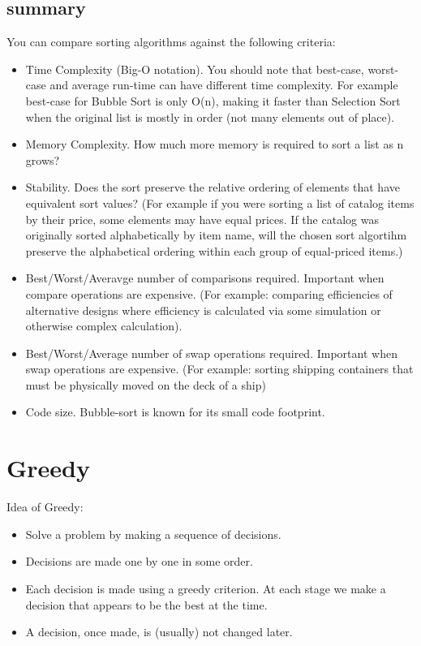 \documentclass[a4paper,11pt,twoside]{book}
\begin{document}
\subsection{summary}
\par You can compare sorting algorithms against the following criteria:
\begin{itemize}
	\item Time Complexity (Big-O notation). You should note that best-case, worst-case and average run-time can have different time complexity. For example best-case for Bubble Sort is only O(n), making it faster than Selection Sort when the original list is mostly in order (not many elements out of place).
	\item Memory Complexity. How much more memory is required to sort a list as n grows?
	
	\item Stability. Does the sort preserve the relative ordering of elements that have equivalent sort values? (For example if you were sorting a list of catalog items by their price, some elements may have equal prices. If the catalog was originally sorted alphabetically by item name, will the chosen sort algortihm preserve the alphabetical ordering within each group of equal-priced items.)
	
	\item Best/Worst/Averavge number of comparisons required. Important when compare operations are expensive. (For example: comparing efficiencies of alternative designs where efficiency is calculated via some simulation or otherwise complex calculation).
	
	\item Best/Worst/Average number of swap operations required. Important when swap operations are expensive. (For example: sorting shipping containers that must be physically moved on the deck of a ship)
	
	\item Code size. Bubble-sort is known for its small code footprint.
\end{itemize}


\section{Greedy}

\par Idea of Greedy:
\begin{itemize}
\item Solve a problem by making a sequence of decisions.

\item Decisions are made one by one in some order.

\item Each decision is made using a greedy criterion. At each stage we make a decision that appears to be the best at the time.

\item A decision, once made, is (usually) not changed later. 
\end{itemize}
\end{document}
